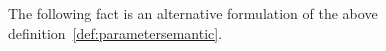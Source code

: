 %
%
The following fact is an alternative formulation of the above definition~\ref{def:parametersemantic}.


